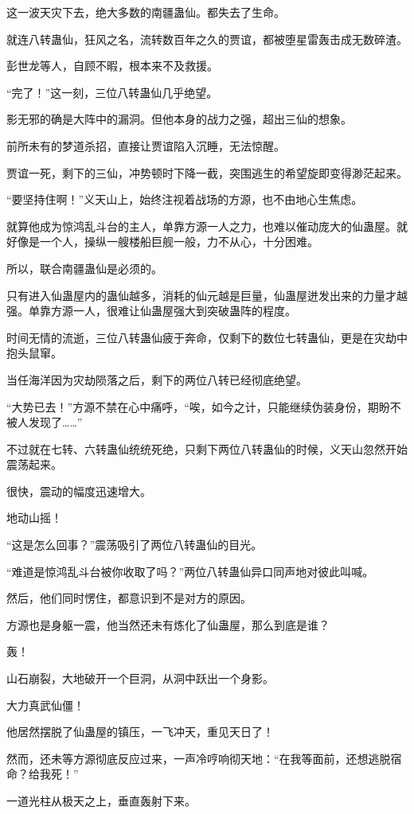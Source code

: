 \begin{this_body}
这一波天灾下去，绝大多数的南疆蛊仙。都失去了生命。

就连八转蛊仙，狂风之名，流转数百年之久的贾谊，都被堕星雷轰击成无数碎渣。

彭世龙等人，自顾不暇，根本来不及救援。

“完了！”这一刻，三位八转蛊仙几乎绝望。

影无邪的确是大阵中的漏洞。但他本身的战力之强，超出三仙的想象。

前所未有的梦道杀招，直接让贾谊陷入沉睡，无法惊醒。

贾谊一死，剩下的三仙，冲势顿时下降一截，突围逃生的希望旋即变得渺茫起来。

“要坚持住啊！”义天山上，始终注视着战场的方源，也不由地心生焦虑。

就算他成为惊鸿乱斗台的主人，单靠方源一人之力，也难以催动庞大的仙蛊屋。就好像是一个人，操纵一艘楼船巨舰一般，力不从心，十分困难。

所以，联合南疆蛊仙是必须的。

只有进入仙蛊屋内的蛊仙越多，消耗的仙元越是巨量，仙蛊屋迸发出来的力量才越强。单靠方源一人，很难让仙蛊屋强大到突破蛊阵的程度。

时间无情的流逝，三位八转蛊仙疲于奔命，仅剩下的数位七转蛊仙，更是在灾劫中抱头鼠窜。

当任海洋因为灾劫陨落之后，剩下的两位八转已经彻底绝望。

“大势已去！”方源不禁在心中痛呼，“唉，如今之计，只能继续伪装身份，期盼不被人发现了……”

不过就在七转、六转蛊仙统统死绝，只剩下两位八转蛊仙的时候，义天山忽然开始震荡起来。

很快，震动的幅度迅速增大。

地动山摇！

“这是怎么回事？”震荡吸引了两位八转蛊仙的目光。

“难道是惊鸿乱斗台被你收取了吗？”两位八转蛊仙异口同声地对彼此叫喊。

然后，他们同时愣住，都意识到不是对方的原因。

方源也是身躯一震，他当然还未有炼化了仙蛊屋，那么到底是谁？

轰！

山石崩裂，大地破开一个巨洞，从洞中跃出一个身影。

大力真武仙僵！

他居然摆脱了仙蛊屋的镇压，一飞冲天，重见天日了！

然而，还未等方源彻底反应过来，一声冷哼响彻天地：“在我等面前，还想逃脱宿命？给我死！”

一道光柱从极天之上，垂直轰射下来。


\end{this_body}
